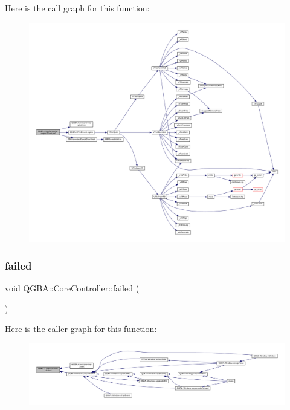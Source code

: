 Here is the call graph for this function\+:
\nopagebreak
\begin{figure}[H]
\begin{center}
\leavevmode
\includegraphics[width=350pt]{class_q_g_b_a_1_1_core_controller_a02397060e26021b7e8bffe715f95accb_cgraph}
\end{center}
\end{figure}
\mbox{\label{class_q_g_b_a_1_1_core_controller_acfef425ed2e3bf107e440947bdb7910c}} 
\subsubsection{\texorpdfstring{failed}{failed}}
{\footnotesize\ttfamily void Q\+G\+B\+A\+::\+Core\+Controller\+::failed (\begin{DoxyParamCaption}{ }\end{DoxyParamCaption})\hspace{0.3cm}{\ttfamily [signal]}}

Here is the caller graph for this function\+:
\nopagebreak
\begin{figure}[H]
\begin{center}
\leavevmode
\includegraphics[width=350pt]{class_q_g_b_a_1_1_core_controller_acfef425ed2e3bf107e440947bdb7910c_icgraph}
\end{center}
\end{figure}
\mbox{\label{class_q_g_b_a_1_1_core_controller_af0aa64669e88804623a8660bc99cb68d}} 
